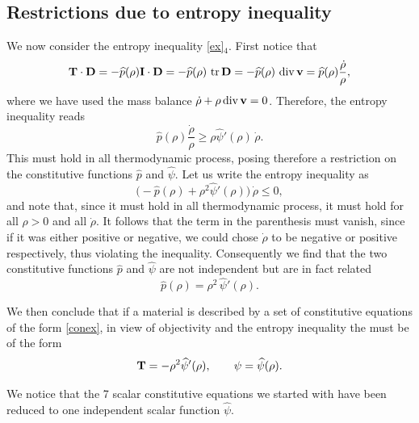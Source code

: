 \subsection{Restrictions due to entropy inequality}
We  now consider the entropy inequality \eqref{ex}$_4$. First notice that
\begin{equation}
\mathbf{T}\cdot\mathbf{D} =-\widehat{p}(\rho)\mathbf{I}\cdot\mathbf{D}=-\widehat{p}(\rho)\, \operatorname{tr}\mathbf{D}=-\widehat{p}(\rho)\,\operatorname{div} \mathbf{v}=\widehat{p}(\rho)\frac{\dot\rho}{\rho},
\end{equation}
where we have used the mass balance $\dot{\rho}+\rho\operatorname{div}\mathbf{v}=0$. Therefore, the entropy inequality reads
\begin{equation}
\widehat{p}(\rho)\frac{\dot\rho}{\rho}\ge \rho \widehat{\psi}'(\rho)\,\dot\rho.
\end{equation}
This must hold in all thermodynamic process, posing therefore a restriction on the constitutive functions $\widehat{p}$ and $\widehat{\psi}$. Let us write the entropy inequality as
\begin{equation}\label{CNex}
\Big( -\widehat{p}(\rho)+\rho^2 \widehat{\psi}'(\rho) \Big)\, \dot{\rho}\leq0,
\end{equation}
and note that, since it must hold in all thermodynamic process, it must hold for all $\rho>0$ and all $\dot\rho$.  It follows that the term
in the parenthesis must vanish, since if it was either positive or negative, we could chose $\dot{\rho}$
to be negative or positive respectively, thus violating the inequality. Consequently we
find that the two constitutive functions $\widehat{p}$ and $\widehat{\psi}$ are not independent but are in fact related
\begin{equation}
\widehat{p}(\rho)=\rho^2\, \widehat{\psi}'(\rho).
\end{equation}

We then conclude that if a material is described by a set of constitutive equations of the form \eqref{conex}, in view of objectivity and the entropy inequality the must be of the form
\begin{equation}
\mathbf{T}=-\rho^2 \widehat{\psi}'(\rho), \qquad \psi=\widehat{\psi}(\rho).
\end{equation}

We notice that the 7 scalar constitutive equations we started with have been reduced to one independent scalar function $\widehat{\psi}$.


